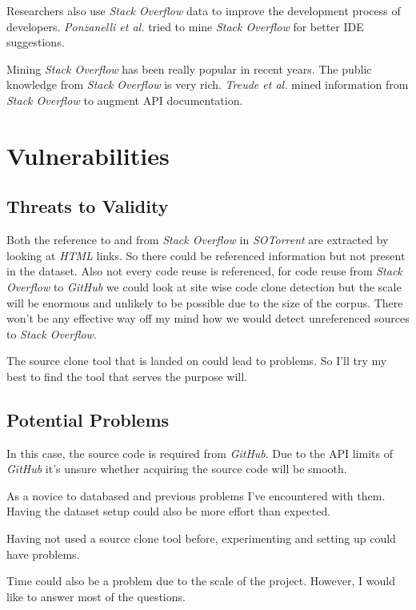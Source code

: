 \documentclass[sigconf]{acmart}
\begin{document}
Researchers also use {\it Stack Overflow} data to improve the development process of developers. {\it Ponzanelli et al.} tried to mine {\it Stack Overflow} for better IDE suggestions. \cite{Ponzanelli:2014:MST:2597073.2597077}

Mining {\it Stack Overflow} has been really popular in recent years. The public knowledge from {\it Stack Overflow} is very rich. {\it Treude et al.} mined information from {\it Stack Overflow} to augment API documentation. \cite{7886920} 

\section{Vulnerabilities}

\subsection{Threats to Validity}

Both the reference to and from {\it Stack Overflow} in {\it SOTorrent} are extracted by looking at {\it HTML} links. So there could be referenced information but not present in the dataset. Also not every code reuse is referenced, for code reuse from {\it Stack Overflow} to {\it GitHub} we could look at site wise code clone detection but the scale will be enormous and unlikely to be possible due to the size of the corpus. There won't be any effective way off my mind how we would detect unreferenced sources to {\it Stack Overflow}.

The source clone tool that is landed on could lead to problems. So I'll try my best to find the tool that serves the purpose will.

\subsection{Potential Problems}

In this case, the source code is required from {\it GitHub}. Due to the API limits of {\it GitHub} it's unsure whether acquiring the source code will be smooth. 

As a novice to databased and previous problems I've encountered with them. Having the dataset setup could also be more effort than expected. 

Having not used a source clone tool before, experimenting and setting up could have problems.

Time could also be a problem due to the scale of the project. However, I would like to answer most of the questions.




\end{document}
